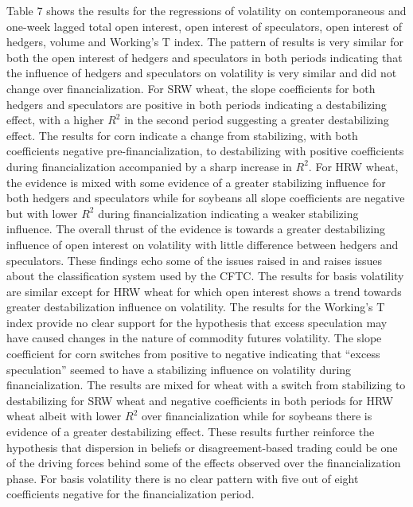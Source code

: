 \documentclass[12pt,]{article}
\begin{document}
Table 7 shows the results for the regressions of volatility on
contemporaneous and one-week lagged total open interest, open interest
of speculators, open interest of hedgers, volume and Working's T index.
The pattern of results is very similar for both the open interest of
hedgers and speculators in both periods indicating that the influence of
hedgers and speculators on volatility is very similar and did not change
over financialization. For SRW wheat, the slope coefficients for both
hedgers and speculators are positive in both periods indicating a
destabilizing effect, with a higher \(R^{2}\) in the second period
suggesting a greater destabilizing effect. The results for corn indicate
a change from stabilizing, with both coefficients negative
pre-financialization, to destabilizing with positive coefficients during
financialization accompanied by a sharp increase in \(R^{2}\). For HRW
wheat, the evidence is mixed with some evidence of a greater stabilizing
influence for both hedgers and speculators while for soybeans all slope
coefficients are negative but with lower \(R^{2}\) during
financialization indicating a weaker stabilizing influence. The overall
thrust of the evidence is towards a greater destabilizing influence of
open interest on volatility with little difference between hedgers and
speculators. These findings echo some of the issues raised in
\citet{cheng_why_2014} and raises issues about the classification system
used by the CFTC. The results for basis volatility are similar except
for HRW wheat for which open interest shows a trend towards greater
destabilization influence on volatility. The results for the Working's T
index provide no clear support for the hypothesis that excess
speculation may have caused changes in the nature of commodity futures
volatility. The slope coefficient for corn switches from positive to
negative indicating that ``excess speculation'' seemed to have a
stabilizing influence on volatility during financialization. The results
are mixed for wheat with a switch from stabilizing to destabilizing for
SRW wheat and negative coefficients in both periods for HRW wheat albeit
with lower \(R^{2}\) over financialization while for soybeans there is
evidence of a greater destabilizing effect. These results further
reinforce the hypothesis that dispersion in beliefs or
disagreement-based trading \citep{stout_uncertainty_2011} could be one
of the driving forces behind some of the effects observed over the
financialization phase. For basis volatility there is no clear pattern
with five out of eight coefficients negative for the financialization
period.
\end{document}

